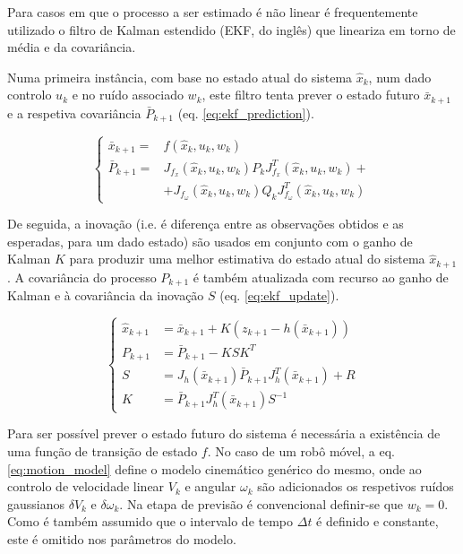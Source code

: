 \documentclass[twocolumn]{article}
\begin{document}
Para casos em que o processo a ser estimado é não linear é frequentemente utilizado o filtro de Kalman estendido (EKF, do inglês) que lineariza em torno de média e da covariância.

Numa primeira instância, com base no estado atual do sistema $\hat{x}_k$, num dado controlo $u_k$ e no ruído associado $w_k$, este filtro tenta prever o estado futuro $\bar{x}_{k+1}$ e a respetiva covariância $\bar{P}_{k+1}$ (eq. \ref{eq:ekf_prediction}).

\begin{equation}
    \begin{cases}
        \bar{x}_{k+1} =& f(\hat{x}_k,u_k,w_k) \\
        \bar{P}_{k+1} =& J_{f_x}(\hat{x}_k,u_k,w_k) P_k J_{f_x}^T(\hat{x}_k,u_k,w_k) + \\
        &+J_{f_\omega}(\hat{x}_k,u_k,w_k) Q_k J_{f_\omega}^T(\hat{x}_k,u_k,w_k)
    \end{cases}
    \label{eq:ekf_prediction}
\end{equation}

De seguida, a inovação (i.e. é diferença entre as observações obtidos e as esperadas, para um dado estado) são usados em conjunto com o ganho de Kalman $K$ para produzir uma melhor estimativa do estado atual do sistema $\hat{x}_{k+1}$. A covariância do processo $P_{k+1}$ é também atualizada com recurso ao ganho de Kalman e à covariância da inovação $S$ (eq. \ref{eq:ekf_update}).

\begin{equation}
    \begin{cases}
        \hat{x}_{k+1} &= \bar{x}_{k+1} + K (z_{k+1} - h(\bar{x}_{k+1})) \\
        P_{k+1} &= \bar{P}_{k+1} - KSK^T \\
        S &= J_h(\bar{x}_{k+1}) \bar{P}_{k+1} J_h^T(\bar{x}_{k+1}) + R \\
        K &= \bar{P}_{k+1} J_h^T(\bar{x}_{k+1}) S^{-1}
    \end{cases}
    \label{eq:ekf_update}
\end{equation}

Para ser possível prever o estado futuro do sistema é necessária a existência de uma função de transição de estado $f$. No caso de um robô móvel, a eq. \ref{eq:motion_model} define o modelo cinemático genérico do mesmo, onde ao controlo de velocidade linear $V_k$ e angular $\omega_k$ são adicionados os respetivos ruídos gaussianos $\delta V_k$ e $\delta \omega_k$. Na etapa de previsão é convencional definir-se que $w_k = 0$. Como é também assumido que o intervalo de tempo $\Delta t$ é definido e constante, este é omitido nos parâmetros do modelo.
\end{document}
